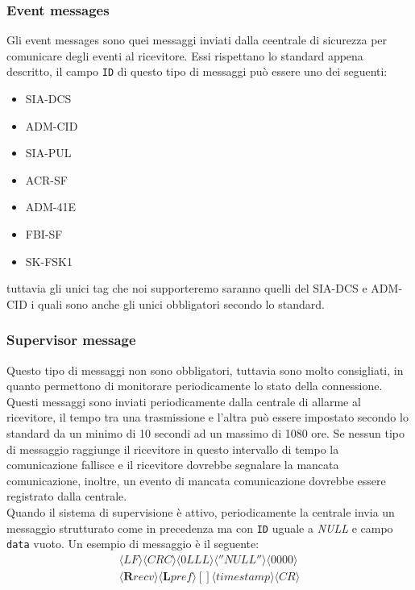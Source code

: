 \subsubsection{Event messages}
Gli event messages sono quei messaggi inviati dalla ceentrale di sicurezza per comunicare degli eventi al ricevitore. Essi rispettano lo standard appena descritto, il campo \texttt{ID} di questo tipo di messaggi può essere uno dei seguenti:
\begin{itemize}
	\item SIA-DCS
	\item ADM-CID
	\item SIA-PUL
	\item ACR-SF
	\item ADM-41E
	\item FBI-SF
	\item SK-FSK1
\end{itemize}
tuttavia gli unici tag che noi supporteremo saranno quelli del SIA-DCS e ADM-CID i quali sono anche gli unici obbligatori secondo lo standard.
\subsubsection{Supervisor message}
Questo tipo di messaggi non sono obbligatori, tuttavia sono molto consigliati, in quanto permettono di monitorare periodicamente lo stato della connessione. Questi messaggi sono inviati periodicamente dalla centrale di allarme al ricevitore, il tempo tra una trasmissione e l'altra può essere impostato secondo lo standard da un minimo di 10 secondi ad un massimo di 1080 ore. Se nessun tipo di messaggio raggiunge il ricevitore in questo intervallo di tempo la comunicazione fallisce e il ricevitore dovrebbe segnalare la mancata comunicazione, inoltre, un evento di mancata comunicazione dovrebbe essere registrato dalla centrale.\\
Quando il sistema di supervisione è attivo, periodicamente la centrale invia un messaggio strutturato come in precedenza ma con \texttt{ID} uguale a \emph{NULL} e campo \texttt{data} vuoto. Un esempio di messaggio è il seguente:
$$
\begin{array}{c}
\langle LF\rangle\langle CRC\rangle\langle 0LLL\rangle\langle ''NULL''\rangle\langle 0000\rangle\\\langle\textbf{R}recv\rangle\langle\textbf{L}pref\rangle
{[]}\langle timestamp\rangle \langle CR\rangle\\
\end{array}	 
$$
